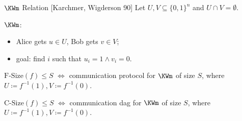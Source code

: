 \begin{frame}{$\KWm$ Relation [Karchmer, Wigderson 90]}
    Let $U, V \subseteq \{0, 1\}^{n}$ and $U \cap V = \emptyset$.

    \vspace{0.1cm}
    $\KWm$:
    \begin{itemize}
        \item Alice gets $u \in U$, Bob gets $v \in V$;
        \item goal: find $i$ such that $u_i = 1 \land v_i = 0$.
    \end{itemize}

    \pause

    \begin{theorem}
        $\mathrm{F\text{-}Size}(f) \le S$ $\Leftrightarrow$ communication protocol
        for $\KWm$ of size $S$, where $U \coloneqq f^{-1}(1), V \coloneqq f^{-1}(0)$.
    \end{theorem}

    \pause
    \begin{theorem}
        $\mathrm{C\text{-}Size}(f) \le S$ $\Leftrightarrow$ communication \alert{dag}
        for $\KWm$ of size $S$, where $U \coloneqq f^{-1}(1), V \coloneqq f^{-1}(0)$.
    \end{theorem}
\end{frame}



